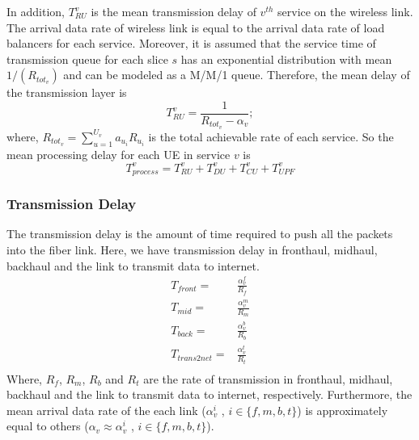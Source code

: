 \documentclass[conference]{IEEEtran}
\begin{document}
In addition, $T_{RU}^{v}$ is the mean transmission delay of $v^{th}$ service on the wireless link. The arrival data rate of wireless link is equal to the arrival data rate of load balancers for each service.
Moreover, it is assumed that the service time of transmission queue for each slice $s$ has
 an exponential distribution with mean $1/(R_{{tot}_v})$ and can be modeled as a M/M/1 queue.
 Therefore,
the mean delay of the transmission layer is
\begin{equation}
 T_{RU}^{v} = \frac{1}{R_{{tot}_v} - \alpha_{v}};
\end{equation}
where, $R_{{tot}_v} = \sum_{u=1}^{U_v}a_{u_i}R_{u_i}$ is the total achievable rate of each service.
So the mean processing delay for each UE in service $v$ is 
\begin{equation}
T_{process}^{v} =  T_{RU}^{v} + T_{DU}^{v} + T_{CU}^{v} + T_{UPF}^{v}
\end{equation}
\subsubsection{Transmission Delay}
The transmission delay is the amount of time required to push all the packets into the fiber link. 
Here, we have transmission delay in fronthaul, midhaul, backhaul and the link to transmit data to internet.
\begin{equation}
\begin{split}
T_{front} =& \frac{\alpha_{v}^{f}}{R_f} \\
T_{mid} =&  \frac{\alpha_{v}^{m}}{R_m} \\
T_{back} =& \frac{\alpha_{v}^{b}}{R_b} \\
T_{trans2net} =& \frac{\alpha_{v}^{t}}{R_t} \\
\end{split}
\end{equation}
Where, $R_f$, $R_m$, $R_b$ and $R_t$ are the rate of transmission in fronthaul, midhaul, backhaul and the link to transmit data to internet, respectively.
Furthermore, the mean arrival data rate of the each link ($\alpha_{v}^i$ , $i \in \{f,m,b,t\}$) is approximately equal to others ($\alpha_{v} \approx \alpha_{v}^i$ , $i \in \{f,m,b,t\}$).  
\end{document}

